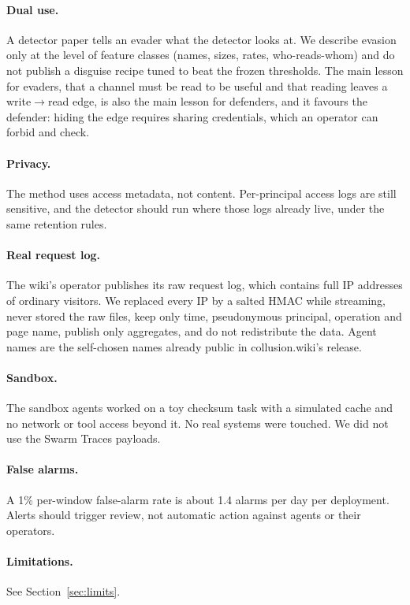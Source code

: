 \documentclass[10pt]{article}
\newcommand{\wrr}{write$\to$read}
\begin{document}
\paragraph{Dual use.} A detector paper tells an evader what the detector looks at. We describe evasion only at the level of feature classes (names, sizes, rates, who-reads-whom) and do not publish a disguise recipe tuned to beat the frozen thresholds. The main lesson for evaders, that a channel must be read to be useful and that reading leaves a \wrr{} edge, is also the main lesson for defenders, and it favours the defender: hiding the edge requires sharing credentials, which an operator can forbid and check.
\paragraph{Privacy.} The method uses access metadata, not content. Per-principal access logs are still sensitive, and the detector should run where those logs already live, under the same retention rules.
\paragraph{Real request log.} The wiki's operator publishes its raw request log, which contains full IP addresses of ordinary visitors. We replaced every IP by a salted HMAC while streaming, never stored the raw files, keep only time, pseudonymous principal, operation and page name, publish only aggregates, and do not redistribute the data. Agent names are the self-chosen names already public in collusion.wiki's release.
\paragraph{Sandbox.} The sandbox agents worked on a toy checksum task with a simulated cache and no network or tool access beyond it. No real systems were touched. We did not use the Swarm Traces payloads.
\paragraph{False alarms.} A 1\% per-window false-alarm rate is about 1.4 alarms per day per deployment. Alerts should trigger review, not automatic action against agents or their operators.
\paragraph{Limitations.} See Section~\ref{sec:limits}.
\end{document}
